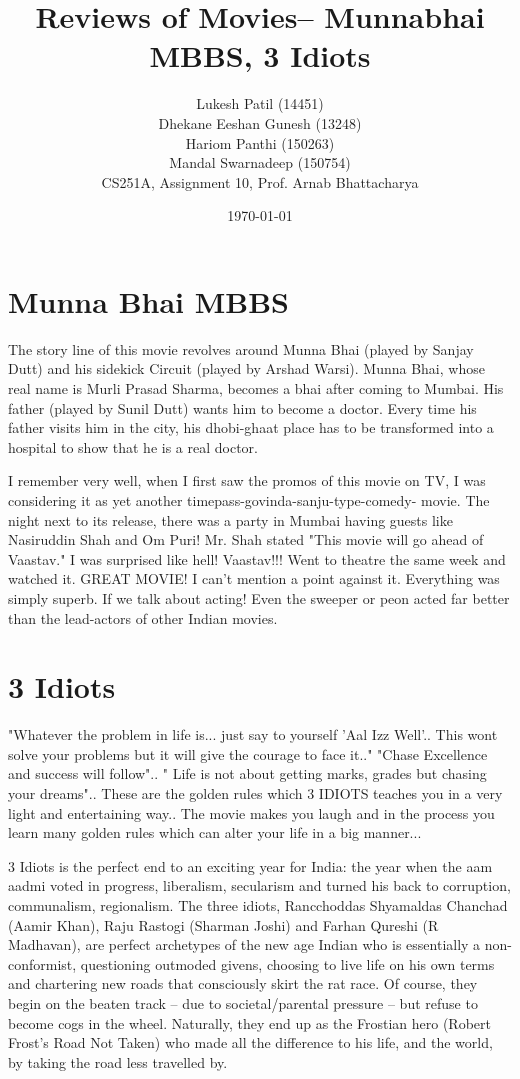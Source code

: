 \documentclass{article}
\author{Lukesh Patil (14451)\\ Dhekane Eeshan Gunesh (13248)\\ Hariom Panthi (150263)\\ Mandal Swarnadeep (150754)\\CS251A, Assignment 10, Prof. Arnab Bhattacharya}
\title{Reviews of Movies-- Munnabhai MBBS, 3 Idiots}
\date{\today}
\begin{document}
\maketitle

\section{Munna Bhai MBBS}
The story line of this movie revolves around Munna Bhai (played by Sanjay Dutt) and his sidekick Circuit (played by Arshad Warsi). Munna Bhai, whose real name is Murli Prasad Sharma, becomes a bhai after coming to Mumbai. His father (played by Sunil Dutt) wants him to become a doctor. Every time his father visits him in the city, his dhobi-ghaat place has to be transformed into a hospital to show that he is a real doctor.

I remember very well, when I first saw the promos of this movie on TV, I was considering it as yet another timepass-govinda-sanju-type-comedy- movie. The night next to its release, there was a party in Mumbai having guests like Nasiruddin Shah and Om Puri! Mr. Shah stated "This movie will go ahead of Vaastav." I was surprised like hell! Vaastav!!! Went to theatre the same week and watched it. GREAT MOVIE! I can't mention a point against it. Everything was simply superb. If we talk about acting! Even the sweeper or peon acted far better than the lead-actors of other Indian movies.



\section{3 Idiots}

"Whatever the problem in life is... just say to yourself 'Aal Izz Well'.. This wont solve your problems but it will give the courage to face it.." "Chase Excellence and success will follow".. " Life is not about getting marks, grades but chasing your dreams".. These are the golden rules which 3 IDIOTS teaches you in a very light and entertaining way.. The movie makes you laugh and in the process you learn many golden rules which can alter your life in a big manner...



3 Idiots is the perfect end to an exciting year for India: the year when the aam aadmi voted in progress, liberalism, secularism and turned his back to corruption, communalism, regionalism. The three idiots, Rancchoddas Shyamaldas Chanchad (Aamir Khan), Raju Rastogi (Sharman Joshi) and Farhan Qureshi (R Madhavan), are perfect archetypes of the new age Indian who is essentially a non-conformist, questioning outmoded givens, choosing to live life on his own terms and chartering new roads that consciously skirt the rat race. Of course, they begin on the beaten track -- due to societal/parental pressure -- but refuse to become cogs in the wheel. Naturally, they end up as the Frostian hero (Robert Frost's Road Not Taken) who made all the difference to his life, and the world, by taking the road less travelled by.
\end{document}
